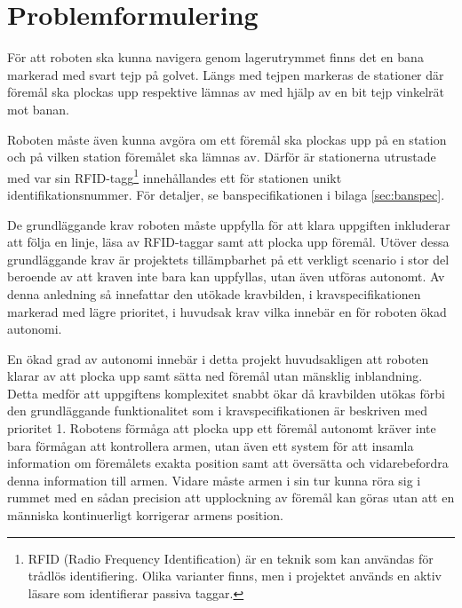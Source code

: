 

\section{Problemformulering}

För att roboten ska kunna navigera genom lagerutrymmet finns det en bana markerad med svart tejp på golvet. Längs med tejpen markeras de stationer där föremål ska plockas upp respektive lämnas av med hjälp av en bit tejp vinkelrät mot banan.


Roboten måste även kunna avgöra om ett föremål ska plockas upp på en station och på vilken station föremålet ska lämnas av. Därför är stationerna utrustade med var sin RFID-tagg\footnote{RFID (Radio Frequency Identification) är en teknik som kan användas för trådlös identifiering. Olika varianter finns, men i projektet används en aktiv läsare som identifierar passiva taggar.} innehållandes ett för stationen unikt identifikationsnummer. För detaljer, se banspecifikationen i bilaga \ref{sec:banspec}.

De grundläggande krav roboten måste uppfylla för att klara uppgiften inkluderar att följa en linje, läsa av RFID-taggar samt att plocka upp föremål. Utöver dessa grundläggande krav är projektets tillämpbarhet på ett verkligt scenario i stor del beroende av att kraven inte bara kan uppfyllas, utan även utföras autonomt. Av denna anledning så innefattar den utökade kravbilden, i kravspecifikationen markerad med lägre prioritet, i huvudsak krav vilka innebär en för roboten ökad autonomi.

En ökad grad av autonomi innebär i detta projekt huvudsakligen att roboten klarar av att plocka upp samt sätta ned föremål utan mänsklig inblandning. Detta medför att uppgiftens komplexitet snabbt ökar då kravbilden utökas förbi den grundläggande funktionalitet som i kravspecifikationen är beskriven med prioritet 1. Robotens förmåga att plocka upp ett föremål autonomt kräver inte bara förmågan att kontrollera armen, utan även ett system för att insamla information om föremålets exakta position samt att översätta och vidarebefordra denna information till armen. Vidare måste armen i sin tur kunna röra sig i rummet med en sådan precision att upplockning av föremål kan göras utan att en människa kontinuerligt korrigerar armens position.
